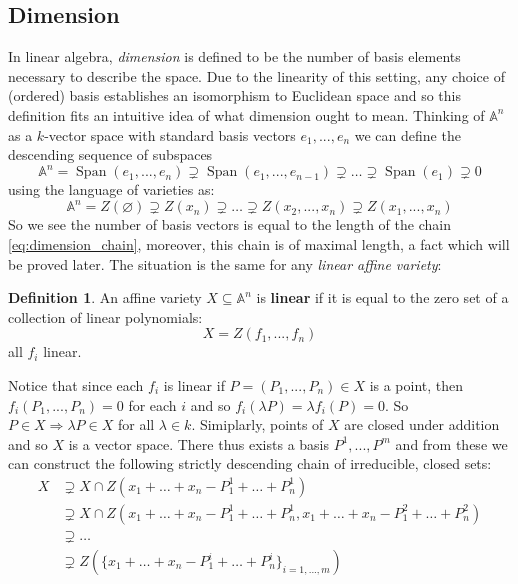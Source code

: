 \documentclass[12pt]{article}
\theoremstyle{plain}
\theoremstyle{definition}
\newtheorem{defn}[thm]{Definition} %
\newcommand{\bb}[1]{\mathbb{#1}}
\begin{document}
\subsection{Dimension}\label{sec:dimension}
In linear algebra, \emph{dimension} is defined to be the number of basis elements necessary to describe the space. Due to the linearity of this setting, any choice of (ordered) basis establishes an isomorphism to Euclidean space and so this definition fits an intuitive idea of what dimension ought to mean. Thinking of $\bb{A}^n$ as a $k$-vector space with standard basis vectors $e_1,...,e_n$ we can define the descending sequence of subspaces
\begin{equation}
    \bb{A}^n = \operatorname{Span}(e_1,...,e_n) \supsetneq \operatorname{Span}(e_1,...,e_{n-1}) \supsetneq \hdots \supsetneq \operatorname{Span}(e_1) \supsetneq 0
\end{equation}
using the language of varieties as:
\begin{equation}\label{eq:dimension_chain}
    \bb{A}^n = Z(\varnothing) \supsetneq Z(x_n) \supsetneq \hdots \supsetneq Z(x_2,...,x_n) \supsetneq Z(x_1,...,x_n)
\end{equation}
So we see the number of basis vectors is equal to the length of the chain \eqref{eq:dimension_chain}, moreover, this chain is of maximal length, a fact which will be proved later. The situation is the same for any \emph{linear affine variety}:
\begin{defn}
An affine variety $X \subseteq \bb{A}^n$ is \textbf{linear} if it is equal to the zero set of a collection of linear polynomials:
\begin{equation}
    X = Z(f_1,...,f_n)
\end{equation}
all $f_i$ linear.
\end{defn}
Notice that since each $f_i$ is linear if $P = (P_1,...,P_n) \in X$ is a point, then $f_i(P_1,...,P_n) = 0$ for each $i$ and so $f_i(\lambda P) = \lambda f_i(P) = 0$. So $P \in X \Longrightarrow\lambda P \in X$ for all $\lambda \in k$. Simiplarly, points of $X$ are closed under addition and so $X$ is a vector space. There thus exists a basis $P^1,...,P^m$ and from these we can construct the following strictly descending chain of irreducible, closed sets:
\begin{align}
    X &\supsetneq X \cap Z(x_1 + \hdots + x_n - P^1_1 + \hdots + P_n^1) \\
    &\supsetneq X \cap Z(x_1 + \hdots + x_n - P^1_1 + \hdots + P_n^1, x_1 + \hdots + x_n - P^2_1 + \hdots + P_n^2) \\
    &\supsetneq \hdots\\
    &\supsetneq Z(\lbrace x_1 + \hdots + x_n - P^i_1 + \hdots + P_n^i\rbrace_{i = 1,...,m})
\end{align}
\end{document}
